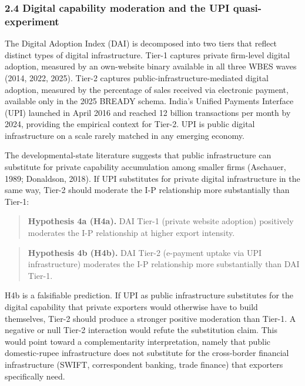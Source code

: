 \documentclass[
  12pt,a4paper]{article}
\begin{document}
\hypertarget{digital-capability-moderation-and-the-upi-quasi-experiment}{%
\subsubsection{2.4 Digital capability moderation and the UPI
quasi-experiment}\label{digital-capability-moderation-and-the-upi-quasi-experiment}}

The Digital Adoption Index (DAI) is decomposed into two tiers that
reflect distinct types of digital infrastructure. Tier-1 captures
private firm-level digital adoption, measured by an own-website binary
available in all three WBES waves (2014, 2022, 2025). Tier-2 captures
public-infrastructure-mediated digital adoption, measured by the
percentage of sales received via electronic payment, available only in
the 2025 BREADY schema. India's Unified Payments Interface (UPI)
launched in April 2016 and reached 12 billion transactions per month by
2024, providing the empirical context for Tier-2. UPI is public digital
infrastructure on a scale rarely matched in any emerging economy.

The developmental-state literature suggests that public infrastructure
can substitute for private capability accumulation among smaller firms
(Aschauer, 1989; Donaldson, 2018). If UPI substitutes for private
digital infrastructure in the same way, Tier-2 should moderate the I-P
relationship more substantially than Tier-1:

\begin{quote}
\textbf{Hypothesis 4a (H4a).} DAI Tier-1 (private website adoption)
positively moderates the I-P relationship at higher export intensity.
\end{quote}

\begin{quote}
\textbf{Hypothesis 4b (H4b).} DAI Tier-2 (e-payment uptake via UPI
infrastructure) moderates the I-P relationship more substantially than
DAI Tier-1.
\end{quote}

H4b is a falsifiable prediction. If UPI as public infrastructure
substitutes for the digital capability that private exporters would
otherwise have to build themselves, Tier-2 should produce a stronger
positive moderation than Tier-1. A negative or null Tier-2 interaction
would refute the substitution claim. This would point toward a
complementarity interpretation, namely that public domestic-rupee
infrastructure does not substitute for the cross-border financial
infrastructure (SWIFT, correspondent banking, trade finance) that
exporters specifically need.
\end{document}
